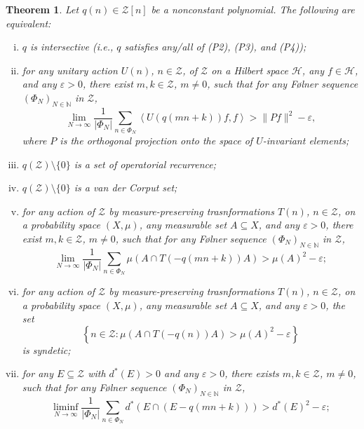 \documentclass[11pt]{amsart}
\theoremstyle{theorem}
\newtheorem{theorem}{Theorem}[section]
\theoremstyle{definition}
\newcommand{\N}{\mathbb{N}}
\newcommand{\mZ}{\mathcal{Z}}
\newcommand{\mH}{\mathcal{H}}
\newcommand{\eps}{\varepsilon}
\begin{document}
\begin{theorem}
    Let $q(n) \in \mZ[n]$ be a nonconstant polynomial.
    The following are equivalent:
    \begin{enumerate}[(i)]
        \item $q$ is intersective (i.e., $q$ satisfies any/all of (P2), (P3), and (P4));
        \item for any unitary action $U(n)$, $n \in \mZ$, of $\mZ$ on a Hilbert space $\mH$, any $f \in \mH$, and any $\eps > 0$, there exist $m,k \in \mZ$, $m \ne 0$, such that for any F{\o}lner sequence $(\Phi_N)_{N \in \N}$ in $\mZ$,
            \begin{equation*}
		          \lim_{N \to \infty} \frac{1}{|\Phi_N|} \sum_{n \in \Phi_N} \left\langle U(q(mn+k))f, f \right\rangle > \|Pf\|^2 - \eps,
	        \end{equation*}
            where $P$ is the orthogonal projection onto the space of $U$-invariant elements;
        \item $q(\mZ) \setminus \{0\}$ is a set of operatorial recurrence;
        \item $q(\mZ) \setminus \{0\}$ is a van der Corput set;
        \item for any action of $\mZ$ by measure-preserving trasnformations $T(n)$, $n \in \mZ$, on a probability space $(X, \mu)$, any measurable set $A \subseteq X$, and any $\eps > 0$, there exist $m, k \in \mZ$, $m \ne 0$, such that for any F{\o}lner sequence $(\Phi_N)_{N \in \N}$ in $\mZ$,
        \begin{equation*}
		          \lim_{N \to \infty} \frac{1}{|\Phi_N|} \sum_{n \in \Phi_N} \mu \left( A \cap T(-q(mn+k)) A \right) > \mu(A)^2 - \eps;
	        \end{equation*}
        \item for any action of $\mZ$ by measure-preserving trasnformations $T(n)$, $n \in \mZ$, on a probability space $(X, \mu)$, any measurable set $A \subseteq X$, and any $\eps > 0$, the set
        \begin{equation*}
            \left\{ n \in \mZ : \mu(A \cap T(-q(n))A) > \mu(A)^2 - \eps \right\}
        \end{equation*}
        is syndetic;
        \item for any $E \subseteq \mZ$ with $d^*(E) > 0$ and any $\eps > 0$, there exists $m, k \in \mZ$, $m \ne 0$, such that for any F{\o}lner sequence $(\Phi_N)_{N \in \N}$ in $\mZ$,
        \begin{equation*}
            \liminf_{N \to \infty} \frac{1}{|\Phi_N|} \sum_{n \in \Phi_N} d^* \left( E \cap (E - q(mn+k)) \right) > d^*(E)^2 - \eps;

\end{equation*}
\end{enumerate}
\end{theorem}
\end{document}
